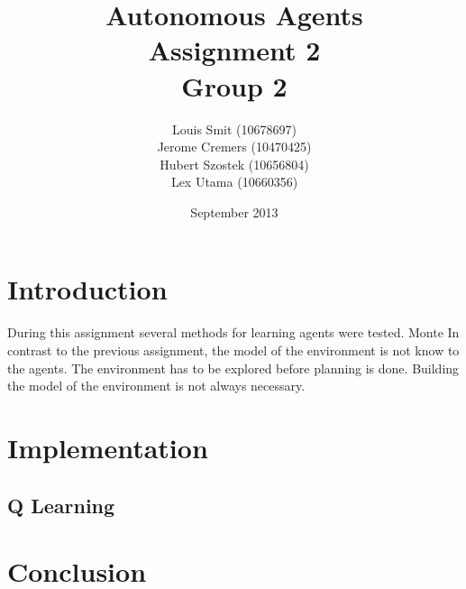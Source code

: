 \documentclass{article}
\title{Autonomous Agents \\ Assignment 2 \\ Group 2}
\author{Louis Smit (10678697) \\ Jerome Cremers (10470425) \\
Hubert Szostek (10656804) \\ Lex Utama (10660356)}
\date{September 2013}
\begin{document}
\maketitle

\section{Introduction}

During this assignment several methods for learning agents were tested. Monte In contrast to the previous assignment, the model of the environment is not know to the agents. The environment has to be explored before planning is done. Building the model of the environment is not always necessary. 




\section{Implementation}


\subsection{Q Learning}



\section{Conclusion}
\end{document}
